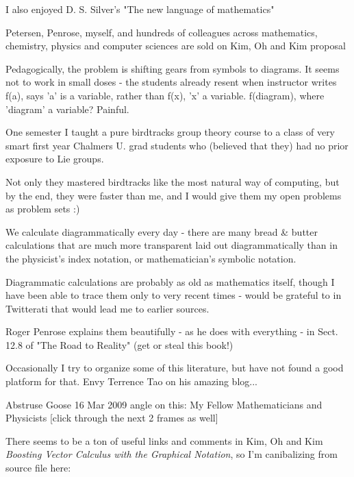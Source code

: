 \begin{description}
I also enjoyed D. S. Silver's "The new language of mathematics"

Petersen, Penrose, myself, and hundreds of colleagues across mathematics, chemistry, physics and computer sciences are sold on Kim, Oh and Kim proposal

Pedagogically, the problem is shifting gears from symbols to diagrams. It seems not to work in small doses - the students already resent when instructor writes f(a), says 'a' is a variable, rather than f(x), 'x' a variable. f(diagram), where 'diagram' a variable?
Painful.

One semester I taught a pure birdtracks group theory course to a class of very smart first year Chalmers U. grad students who (believed that they) had no prior exposure to Lie groups.

Not only they mastered birdtracks like the most natural way of computing, but by the end, they were faster than me, and I would give them my open problems as problem sets :)

We calculate diagrammatically every day - there are many bread \& butter calculations that are much more transparent laid out diagrammatically than in the physicist's index notation, or mathematician's symbolic notation.

Diagrammatic calculations are probably as old as mathematics itself, though I have been able to trace them only to very recent times - would be grateful to in Twitterati that would lead me to earlier sources.

Roger Penrose explains them beautifully - as he does with everything - in Sect. 12.8 of "The Road to Reality" (get or steal this book!)

Occasionally I try to organize some of this literature, but have not found a good platform for that. Envy Terrence Tao on his amazing blog...

Abstruse Goose 16 Mar 2009 angle on this:
My Fellow Mathematicians and Physicists
    [click through the next 2 frames as well]

\item[2019-12-08 Predrag] There seems to be a ton of useful links and comments
in Kim, Oh and Kim
{\em Boosting Vector Calculus with the Graphical Notation},
so I'm canibalizing from  source file here:


\end{description}
